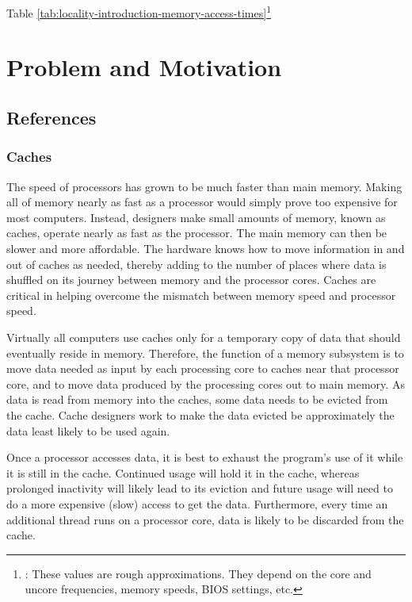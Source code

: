 Table
\ref{tab:locality-introduction-memory-access-times}\footnote{\cite{Levinthal2009}:
  These values are rough approximations. They depend on the core and
  uncore frequencies, memory speeds, BIOS settings, etc.}

\section{Problem and Motivation}
\label{sec:locality-intro-problem-and-motivation}


\subsection*{References}

\subsubsection{Caches}

The speed of processors has grown to be much faster than main
memory. Making all of memory nearly as fast as a processor would
simply prove too expensive for most computers. Instead, designers make
small amounts of memory, known as caches, operate nearly as fast as
the processor. The main memory can then be slower and more
affordable. The hardware knows how to move information in and out of
caches as needed, thereby adding to the number of places where data is
shuffled on its journey between memory and the processor cores. Caches
are critical in helping overcome the mismatch between memory speed and
processor speed.

Virtually all computers use caches only for a temporary copy of data
that should eventually reside in memory. Therefore, the function of a
memory subsystem is to move data needed as input by each processing
core to caches near that processor core, and to move data produced by
the processing cores out to main memory. As data is read from memory
into the caches, some data needs to be evicted from the cache. Cache
designers work to make the data evicted be approximately the data
least likely to be used again.

Once a processor accesses data, it is best to exhaust the program’s
use of it while it is still in the cache. Continued usage will hold it
in the cache, whereas prolonged inactivity will likely lead to its
eviction and future usage will need to do a more expensive (slow)
access to get the data. Furthermore, every time an additional thread
runs on a processor core, data is likely to be discarded from the
cache.

